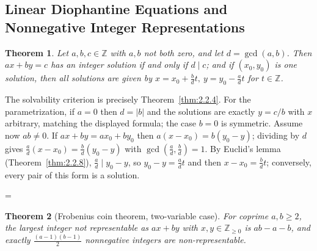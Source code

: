 \documentclass[11pt]{article}
\makeatletter
\theoremstyle{ntstyle}
\newtheorem{theorem}{Theorem}[subsection]
\let\nt@closedisplay\]
\def\nt@guardedclose{\@ifnextchar\par{\nt@closeafterpar}{\@ifnextchar\end{\postdisplaypenalty\@M\nt@closedisplay}{\nt@closedisplay}}}
\def\nt@closeafterpar\par{\@ifnextchar\par{\nt@closeafterpar}{\@ifnextchar\end{\postdisplaypenalty\@M\nt@closedisplay\par}{\nt@closedisplay\par}}}
\renewenvironment{proof}[1][\proofname]{\par
  \pushQED{\qed}\normalfont\topsep\medskipamount\edef\nt@afterproof{\@endparpenalty=\the\@endparpenalty\relax}\@beginparpenalty\@M\@endparpenalty\@M\let\]\nt@guardedclose\trivlist\item[]\textit{#1\@addpunct{.}} \ignorespaces}{\ifvmode\addpenalty\@M\fi\popQED\nt@afterproof\endtrivlist\@endpefalse}
\makeatother
\begin{document}
\subsection{Linear Diophantine Equations and Nonnegative Integer Representations}

\begin{theorem}\label{thm:2.6.1}
	Let $a,b,c\in\mathbb{Z}$ with $a,b$ not both zero, and let $d=\gcd(a, b)$. Then
	$ax+by=c$ has an integer solution if and only if $d\mid c$; and if $(x_0,y_0)$
	is one solution, then all solutions are given by
	$x=x_0+\tfrac{b}{d}t,\ y=y_0-\tfrac{a}{d}t$ for $t\in\mathbb{Z}$.

\end{theorem}

\begin{proof} The solvability criterion is precisely Theorem~\ref{thm:2.2.4}. For the parametrization, if $a=0$ then $d=|b|$ and the solutions are exactly $y=c/b$ with $x$ arbitrary, matching the displayed formula; the case $b=0$ is symmetric. Assume now $ab\neq0$. If $ax+by=ax_0+by_0$ then $a(x-x_0)=b(y_0-y)$; dividing by $d$ gives $\tfrac{a}{d}(x-x_0)=\tfrac{b}{d}(y_0-y)$ with
	$\gcd(\tfrac{a}{d}, \tfrac{b}{d})=1$. By Euclid's lemma (Theorem~\ref{thm:2.2.8}), $\tfrac{a}{d}\mid
		y_0-y$, so $y_0-y=\tfrac{a}{d} t$ and then $x-x_0=\tfrac{b}{d} t$;
	conversely, every pair of this form is a solution.

\end{proof}
\begin{theorem}[Frobenius coin theorem, two-variable case]\label{thm:2.6.2} For coprime $a,b\ge2$, the largest integer not
	representable as $ax+by$ with $x,y\in\mathbb{Z}_{\ge0}$ is $ab-a-b$, and
	exactly $\tfrac{(a-1)(b-1)}{2}$ nonnegative integers are non-representable.

\end{theorem}
\end{document}

